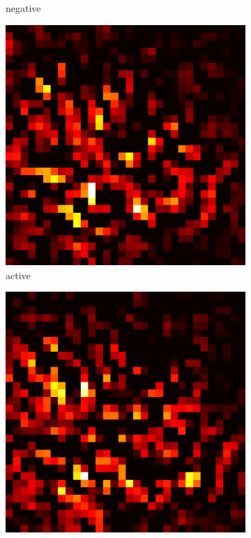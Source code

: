 \documentclass[preprint,12pt]{elsarticle}
\begin{document}
\begin{figure}
\begin{subfigure}{0.14\textwidth}
        \caption{negative}
    \end{subfigure}
    \hfill
    \begin{subfigure}{0.14\textwidth}
        \centering
        \includegraphics[width=\linewidth]{../visualizations/examples/cifar10/resnet18/active_saliency_map/8.png}
        \caption{active}
    \end{subfigure}
    \hfill
    \begin{subfigure}{0.14\textwidth}
        \centering
        \includegraphics[width=\linewidth]{../visualizations/examples/cifar10/resnet18/inactive_saliency_map/8.png}

\end{subfigure}
\end{figure}
\end{document}
